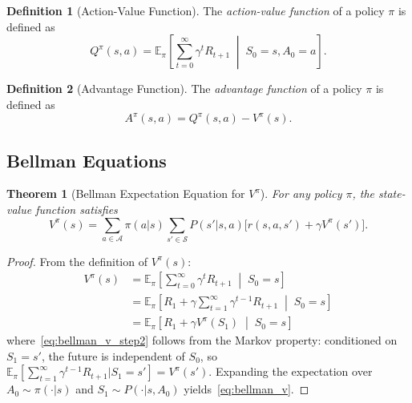 \documentclass[11pt,a4paper]{article}
\theoremstyle{definition}
\newtheorem{definition}{Definition}[section]
\theoremstyle{plain}
\newtheorem{theorem}{Theorem}[section]
\theoremstyle{remark}
\newcommand{\E}{\mathbb{E}}
\begin{document}
\begin{definition}[Action-Value Function]
\label{def:action_value}
The \emph{action-value function} of a policy $\pi$ is defined as
\begin{equation}
    Q^\pi(s,a) = \E_\pi\!\left[\sum_{t=0}^{\infty} \gamma^t R_{t+1} \;\middle|\; S_0 = s, A_0 = a\right].
    \label{eq:action_value}
\end{equation}
\end{definition}

\begin{definition}[Advantage Function]
\label{def:advantage}
The \emph{advantage function} of a policy $\pi$ is defined as
\begin{equation}
    A^\pi(s,a) = Q^\pi(s,a) - V^\pi(s).
    \label{eq:advantage}
\end{equation}
\end{definition}

\subsection{Bellman Equations}
\label{subsec:bellman}

\begin{theorem}[Bellman Expectation Equation for $V^\pi$]
\label{thm:bellman_v}
For any policy $\pi$, the state-value function satisfies
\begin{equation}
    V^\pi(s) = \sum_{a \in \mathcal{A}} \pi(a|s) \sum_{s' \in \mathcal{S}} P(s'|s,a)\bigl[r(s,a,s') + \gamma V^\pi(s')\bigr].
    \label{eq:bellman_v}
\end{equation}
\end{theorem}

\begin{proof}
From the definition of $V^\pi(s)$:
\begin{align}
    V^\pi(s) &= \E_\pi\!\left[\sum_{t=0}^{\infty} \gamma^t R_{t+1} \;\middle|\; S_0 = s\right] \nonumber\\
    &= \E_\pi\!\left[R_1 + \gamma \sum_{t=1}^{\infty} \gamma^{t-1} R_{t+1} \;\middle|\; S_0 = s\right] \nonumber\\
    &= \E_\pi\!\left[R_1 + \gamma V^\pi(S_1) \;\middle|\; S_0 = s\right] \label{eq:bellman_v_step2}
\end{align}
where~\eqref{eq:bellman_v_step2} follows from the Markov property: conditioned on $S_1 = s'$, the future is independent of $S_0$, so $\E_\pi[\sum_{t=1}^{\infty} \gamma^{t-1} R_{t+1} | S_1 = s'] = V^\pi(s')$. Expanding the expectation over $A_0 \sim \pi(\cdot|s)$ and $S_1 \sim P(\cdot|s, A_0)$ yields~\eqref{eq:bellman_v}.
\end{proof}
\end{document}
